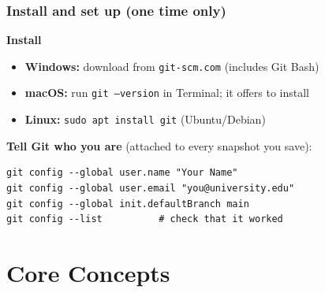 \documentclass[aspectratio=169,10pt,compress]{beamer}
\newcommand{\cmd}[1]{\texttt{\color{gitred}#1}}
\begin{document}
\begin{frame}[t,fragile] \frametitle{Install and set up (one time only)}
  \textbf{Install}
  \begin{itemize}
    \item \textbf{Windows:} download from \texttt{git-scm.com} (includes Git Bash)
    \item \textbf{macOS:} run \cmd{git --version} in Terminal; it offers to install
    \item \textbf{Linux:} \cmd{sudo apt install git} (Ubuntu/Debian)
  \end{itemize}

  \textbf{Tell Git who you are} (attached to every snapshot you save):
\begin{lstlisting}
git config --global user.name "Your Name"
git config --global user.email "you@university.edu"
git config --global init.defaultBranch main
git config --list          # check that it worked
\end{lstlisting}
\end{frame}

\section[Concepts]{Core Concepts}
\end{document}
